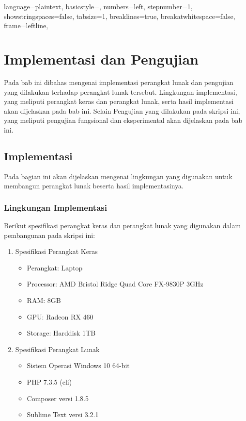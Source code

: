 
\lstset
{ 
    language=plaintext,
    basicstyle=\footnotesize,
    numbers=left,
    stepnumber=1,
    showstringspaces=false,
    tabsize=1,
    breaklines=true,
    breakatwhitespace=false,
    frame=leftline,
}

\chapter{Implementasi dan Pengujian}
\label{chap:implementasiDanPengujian}

Pada bab ini dibahas mengenai implementasi perangkat lunak dan pengujian yang dilakukan terhadap perangkat lunak tersebut. Lingkungan implementasi, yang meliputi perangkat keras dan perangkat lunak, serta hasil implementasi akan dijelaskan pada bab ini. Selain Pengujian yang dilakukan pada skripsi ini, yang meliputi pengujian fungsional dan eksperimental akan dijelaskan pada bab ini.

\section{Implementasi}
Pada bagian ini akan dijelaskan mengenai lingkungan yang digunakan untuk membangun perangkat lunak beserta hasil implementasinya.

\subsection{Lingkungan Implementasi}
Berikut spesifikasi perangkat keras dan perangkat lunak yang digunakan dalam pembangunan pada skripsi ini:

\begin{enumerate}
	\item Spesifikasi Perangkat Keras
	
		\begin{itemize}
			\item Perangkat: Laptop
			\item Processor: AMD Bristol Ridge Quad Core FX-9830P 3GHz
			\item RAM: 8GB
			\item GPU: Radeon RX 460
			\item Storage: Harddisk 1TB
		\end{itemize}		

	\item Spesifikasi Perangkat Lunak

		\begin{itemize}
			\item Sistem Operasi Windows 10 64-bit
			\item PHP 7.3.5 (cli)
			\item Composer versi 1.8.5
			\item Sublime Text versi 3.2.1
		\end{itemize}	
	
\end{enumerate}

